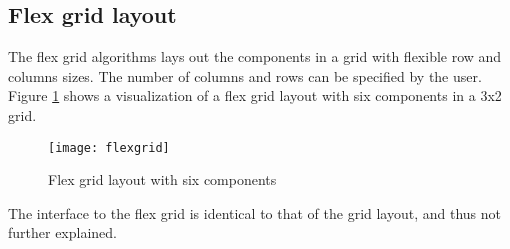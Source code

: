 \subsection{Flex grid layout}
The flex grid algorithms lays out the components in a grid with flexible row and columns sizes. The number of columns and rows can be specified by the user. Figure \ref{flex-grid} shows a visualization of a flex grid layout with six components in a 3x2 grid. 

\begin{figure}[h]
\centering
\texttt{[image: flexgrid]}
\caption{Flex grid layout with six components}
\label{flex-grid}
\end{figure}

The interface to the flex grid is identical to that of the grid layout, and thus not further explained.
